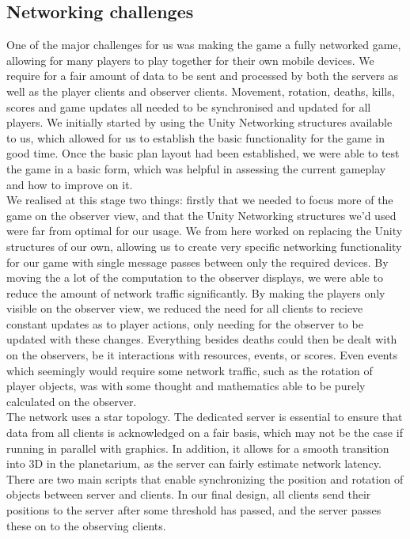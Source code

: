 \documentclass[11pt,a4paper]{article}
\begin{document}
 \subsection{Networking challenges}
  
  \noindent

  One of the major challenges for us was making the game a fully networked game, allowing for many players to play together for their own mobile devices. We require for a fair amount of data to be sent and processed by both the servers as well as the player clients and observer clients. Movement, rotation, deaths, kills, scores and game updates all needed to be synchronised and updated for all players. We initially started by using the Unity Networking structures available to us, which allowed for us to establish the basic functionality for the game in good time. Once the basic plan layout had been established, we were able to test the game in a basic form, which was helpful in assessing the current gameplay and how to improve on it. \\

  We realised at this stage two things: firstly that we needed to focus more of the game on the observer view, and that the Unity Networking structures we'd used were far from optimal for our usage. We from here worked on replacing the Unity structures of our own, allowing us to create very specific networking functionality for our game with single message passes between only the required devices. By moving the a lot of the computation to the observer displays, we were able to reduce the amount of network traffic significantly. By making the players only visible on the observer view, we reduced the need for all clients to recieve constant updates as to player actions, only needing for the observer to be updated with these changes. Everything besides deaths could then be dealt with on the observers, be it interactions with resources, events, or scores. Even events which seemingly would require some network traffic, such as the rotation of player objects, was with some thought and mathematics able to be purely calculated on the observer. \\

  The network uses a star topology. The dedicated server is essential to ensure that data from all clients is acknowledged on a fair basis, which may not be the case if running in parallel with graphics. In addition, it allows for a smooth transition into 3D in the planetarium, as the server can fairly estimate network latency. There are two main scripts that enable synchronizing the position and rotation of objects between server and clients. In our final design, all clients send their positions to the server after some threshold has passed, and the server passes these on to the observing clients. \\
\end{document}
